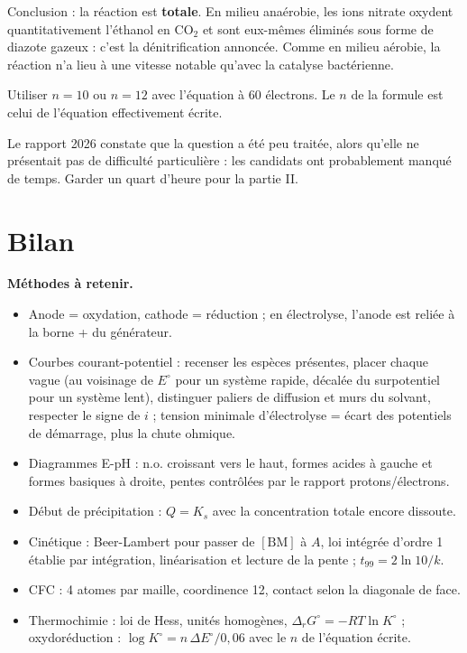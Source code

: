 \documentclass[11pt,a4paper]{article}
\providecommand{\tightlist}{\setlength{\itemsep}{0pt}\setlength{\parskip}{0pt}}
\begin{document}
Conclusion : la réaction est \textbf{totale}. En milieu anaérobie, les ions nitrate oxydent quantitativement l'éthanol en \(\mathrm{CO_2}\) et sont eux-mêmes éliminés sous forme de diazote gazeux : c'est la dénitrification annoncée. Comme en milieu aérobie, la réaction n'a lieu à une vitesse notable qu'avec la catalyse bactérienne.

\begin{piege}

Utiliser \(n=10\) ou \(n=12\) avec l'équation à 60 électrons. Le \(n\) de la formule est celui de l'équation effectivement écrite.

\end{piege}

\begin{jury}

Le rapport 2026 constate que la question a été peu traitée, alors qu'elle ne présentait pas de difficulté particulière : les candidats ont probablement manqué de temps. Garder un quart d'heure pour la partie II.

\end{jury}

\hypertarget{bilan}{%
\section{Bilan}\label{bilan}}

\textbf{Méthodes à retenir.}

\begin{itemize}
\tightlist
\item
  Anode = oxydation, cathode = réduction ; en électrolyse, l'anode est reliée à la borne + du générateur.
\item
  Courbes courant-potentiel : recenser les espèces présentes, placer chaque vague (au voisinage de \(E^\circ\) pour un système rapide, décalée du surpotentiel pour un système lent), distinguer paliers de diffusion et murs du solvant, respecter le signe de \(i\) ; tension minimale d'électrolyse = écart des potentiels de démarrage, plus la chute ohmique.
\item
  Diagrammes E-pH : n.o. croissant vers le haut, formes acides à gauche et formes basiques à droite, pentes contrôlées par le rapport protons/électrons.
\item
  Début de précipitation : \(Q=K_s\) avec la concentration totale encore dissoute.
\item
  Cinétique : Beer-Lambert pour passer de \([\mathrm{BM}]\) à \(A\), loi intégrée d'ordre 1 établie par intégration, linéarisation et lecture de la pente ; \(t_{99}=2\ln10/k\).
\item
  CFC : 4 atomes par maille, coordinence 12, contact selon la diagonale de face.
\item
  Thermochimie : loi de Hess, unités homogènes, \(\Delta_rG^\circ=-RT\ln K^\circ\) ; oxydoréduction : \(\log K^\circ=n\,\Delta E^\circ/0{,}06\) avec le \(n\) de l'équation écrite.
\end{itemize}
\end{document}
